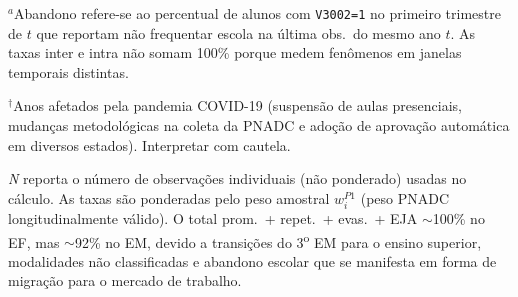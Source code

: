 \begin{table}[htbp]
\begin{threeparttable}
\begin{tablenotes}
\item $^{a}$Abandono refere-se ao percentual de alunos com \texttt{V3002=1} no primeiro trimestre de $t$ que reportam n\~ao frequentar escola na \'ultima obs.\ do mesmo ano $t$. As taxas inter e intra n\~ao somam 100\% porque medem fen\^omenos em janelas temporais distintas.
\item $^{\dagger}$Anos afetados pela pandemia COVID-19 (suspens\~ao de aulas presenciais, mudan\c{c}as metodol\'ogicas na coleta da PNADC e ado\c{c}\~ao de aprova\c{c}\~ao autom\'atica em diversos estados). Interpretar com cautela.
\item \emph{N} reporta o n\'umero de observa\c{c}\~oes individuais (n\~ao ponderado) usadas no c\'alculo. As taxas s\~ao ponderadas pelo peso amostral $w_i^{P1}$ (peso PNADC longitudinalmente v\'alido). O total prom.\ + repet.\ + evas.\ + EJA $\sim$100\% no EF, mas $\sim$92\% no EM, devido a transi\c{c}\~oes do 3\textsuperscript{o} EM para o ensino superior, modalidades n\~ao classificadas e abandono escolar que se manifesta em forma de migra\c{c}\~ao para o mercado de trabalho.
\end{tablenotes}
\end{threeparttable}
\end{table}
